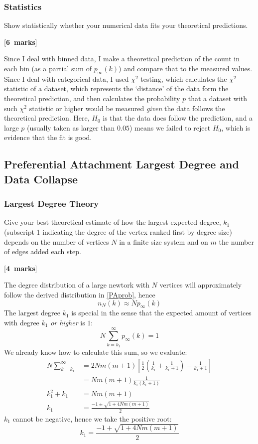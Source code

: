 \documentclass[a4paper,12pt]{article}
\newcounter{nmarks}
\newcommand{\qmarks}[1]{\addtocounter{nmarks}{#1} }
\renewcommand{\qmarks}[1]{\addtocounter{nmarks}{#1} \hspace*{\fill} [\textbf{#1~marks}]}
\begin{document}
\subsubsection{Statistics}
Show statistically whether your numerical data fits your theoretical predictions. \qmarks{6}

Since I deal with binned data, I make a theoretical prediction of the count in each bin (as a partial sum of $p_\infty(k)$) and compare that to the measured values. Since I deal with categorical data, I used $\chi^2$ testing, which calculates the $\chi^2$ statistic of a dataset, which represents the `distance' of the data form the theoretical prediction, and then calculates the probability $p$ that a dataset with such $\chi^2$ statistic or higher would be measured \textit{given} the data follows the theoretical prediction. Here, $H_0$ is that the data does follow the prediction, and a large $p$ (usually taken as larger than $0.05$) means we failed to reject $H_0$, which is evidence that the fit is good.


\subsection{Preferential Attachment Largest Degree and Data Collapse}


\subsubsection{Largest Degree Theory}
Give your best theoretical estimate of how the largest expected degree, $k_\mathrm{1}$ (subscript 1 indicating the degree of the vertex ranked first by degree size) depends on the number of vertices $N$ in a finite size system and on $m$ the number of edges added each step. \qmarks{4}

The degree distribution of a large newtork with $N$ vertices will approximately follow the derived distribution in \ref{PAprob}, hence
$$n_N(k)\approx Np_\infty(k)$$
The largest degree $k_1$ is special in the sense that the expected amount of vertices with degree $k_1$ \textit{or higher} is $1$:
\begin{equation} \label{MaximumDegree}
N\sum_{k=k_1}^\infty p_\infty(k)=1
\end{equation}
We already know how to calculate this sum, so we evaluate:
\begin{align*}
N\sum_{k=k_1}^\infty &= 2Nm(m+1)\left[\frac{1}{2}\left(\frac{1}{k_1}+\frac{1}{k_1+1}\right)-\frac{1}{k_1+1}\right]\\
&=Nm(m+1)\frac{1}{k_1(k_1+1)}\\
k_1^2+k_1 &= Nm(m+1)\\
k_1 &= \frac{-1\pm\sqrt{1+4Nm(m+1)}}{2}
\end{align*}
$k_1$ cannot be negative, hence we take the positive root:
\begin{equation} \label{MaximumDegreePA}
k_1 = \frac{-1+\sqrt{1+4Nm(m+1)}}{2}
\end{equation}
\end{document}
